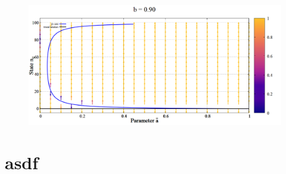 \begin{figure}[h!]
 \centering
  \includegraphics[width=\linewidth]{images/appendix/vectors/5.png}
\end{figure}

\newpage
\section{asdf}
\label{apndx:asdf}